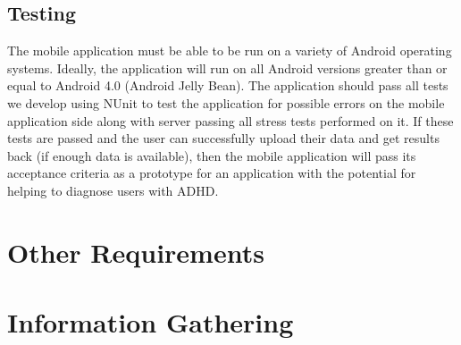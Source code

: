 \documentclass[a4wide]{article}
\begin{document}
\subsection{Testing}
The mobile application must be able to be run on a variety of Android operating
systems. Ideally, the application will run on all Android versions greater than
or equal to Android 4.0 (Android Jelly Bean). The application should pass all 
tests we develop using NUnit to test the application for possible errors on the 
mobile application side along with server passing all stress tests performed on 
it. If these tests are passed and the user can successfully upload their data and
get results back (if enough data is available), then the mobile application will 
pass its acceptance criteria as a prototype for an application with the potential 
for helping to diagnose users with ADHD.




\section{Other Requirements}
\newpage
\appendix
\appendixpage

\section{Information Gathering}
\end{document}

